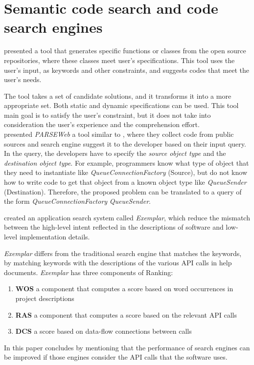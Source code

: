 \documentclass[12pt,mscthesis]{usiinfthesis}
\begin{document}
	\section{Semantic code search and code search engines }

	\citet{Reiss:2009:SCS:1555001.1555040} presented a tool that generates specific functions or classes from the open source repositories, where these classes meet user's specifications. This tool uses the user's input, as keywords and other constraints, and suggests codes that meet the user's needs.


	The tool takes a set of candidate solutions, and it transforms it into a more appropriate set. Both static and dynamic specifications can be used. This tool main goal is to satisfy the user's constraint, but it does not take into consideration the user's experience and the comprehension effort.\\
	

	\citet{Thummalapenta:2007:PPA:1321631.1321663} presented \emph{PARSEWeb} a tool similar to \citet{Reiss:2009:SCS:1555001.1555040}, where they collect code from public sources and search engine suggest it to the developer based on their input query.\\ In the query, the developers have to specify the \textit{source object type} and the \textit{destination object type}.  For example, programmers know what type of object that they need to instantiate like \emph{QueueConnectionFactory} (Source), but do not know how to write code to get that object from a known object type like \emph{QueueSender} (Destination). Therefore, the proposed problem can be translated to a query of the form \emph{QueueConnectionFactory} \rightarrow \emph{QueueSender}.

	\citet{McMillan:2011:FRF:1985793.1986032} created an application search system called \textit{Exemplar}, which reduce the mismatch between the high-level intent reflected in the descriptions of software and low-level implementation details.

	 \textit{Exemplar} differs from the traditional search engine that matches the keywords, by matching keywords with the descriptions of the various API calls in help documents.
	\textit{Exemplar} has three components of Ranking: 
	\begin{enumerate}
		\item \textbf{WOS} a component that computes a score based on word occurrences in project descriptions
		\item \textbf{RAS} a component that computes a score based on the relevant API calls
		\item \textbf{DCS} a score based on data-flow connections between calls
	\end{enumerate}
	In this paper \citet{McMillan:2011:FRF:1985793.1986032} concludes by mentioning that the performance of search engines can be improved if those engines consider the API calls that the software uses.\\
\end{document}

